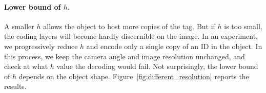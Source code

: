 \documentclass[12pt]{report}
\begin{document}


\paragraph{Lower bound of $h$.}
A smaller $h$ allows the object to host more copies of the tag. But if 
$h$ is too small, the coding layers will become hardly discernible on the image.
In an experiment, we progressively reduce $h$ and encode only a single copy
of an ID in the object. In this process, we keep the camera angle and image resolution
unchanged, and check at what $h$ value the decoding would fail.
Not surprisingly, the lower bound of $h$ depends on the object shape. 
Figure~\ref{fig:different_resolution} reports the results.
\end{document}
